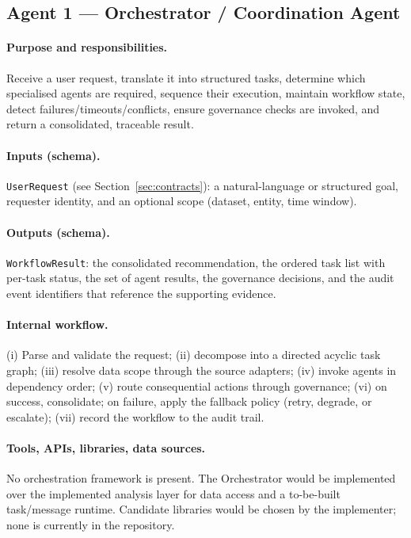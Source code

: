 \documentclass[11pt,a4paper]{article}
\newcommand{\code}[1]{\texttt{#1}}
\begin{document}
\subsection{Agent 1 --- Orchestrator / Coordination Agent}
\paragraph{Purpose and responsibilities.} Receive a user request, translate it into structured tasks, determine which specialised agents are required, sequence their execution, maintain workflow state, detect failures/timeouts/conflicts, ensure governance checks are invoked, and return a consolidated, traceable result.

\paragraph{Inputs (schema).} \code{UserRequest} (see Section~\ref{sec:contracts}): a natural-language or structured goal, requester identity, and an optional scope (dataset, entity, time window).

\paragraph{Outputs (schema).} \code{WorkflowResult}: the consolidated recommendation, the ordered task list with per-task status, the set of agent results, the governance decisions, and the audit event identifiers that reference the supporting evidence.

\paragraph{Internal workflow.} (i) Parse and validate the request; (ii) decompose into a directed acyclic task graph; (iii) resolve data scope through the source adapters; (iv) invoke agents in dependency order; (v) route consequential actions through governance; (vi) on success, consolidate; on failure, apply the fallback policy (retry, degrade, or escalate); (vii) record the workflow to the audit trail.

\paragraph{Tools, APIs, libraries, data sources.} No orchestration framework is present. The Orchestrator would be implemented over the implemented analysis layer for data access and a to-be-built task/message runtime. Candidate libraries would be chosen by the implementer; none is currently in the repository.
\end{document}
